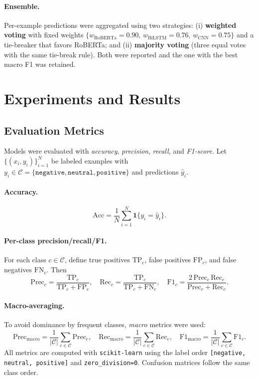 \documentclass[10pt]{article}
\begin{document}
\paragraph{Ensemble.}
Per-example predictions were aggregated using two strategies: (i) \textbf{weighted voting} with fixed weights $\{w_{\text{RoBERTa}}=0.90,\,w_{\text{BiLSTM}}=0.76,\,w_{\text{CNN}}=0.75\}$ and a tie-breaker that favors RoBERTa; and (ii) \textbf{majority voting} (three equal votes with the same tie-break rule). Both were reported and the one with the best macro F1 was retained.
\section{Experiments and Results}

\subsection{Evaluation Metrics}
Models were evaluated with \emph{accuracy}, \emph{precision}, \emph{recall}, and \emph{F1-score}. Let $\{(x_i,y_i)\}_{i=1}^N$ be labeled examples with $y_i \in \mathcal{C}=\{\texttt{negative},\texttt{neutral},\texttt{positive}\}$ and predictions $\hat{y}_i$.

\paragraph{Accuracy.}
\[
\mathrm{Acc}=\frac{1}{N}\sum_{i=1}^{N}\mathbf{1}\{y_i=\hat{y}_i\}.
\]

\paragraph{Per-class precision/recall/F1.}
For each class $c\in\mathcal{C}$, define true positives $\mathrm{TP}_c$, false positives $\mathrm{FP}_c$, and false negatives $\mathrm{FN}_c$. Then
\[
\mathrm{Prec}_c=\frac{\mathrm{TP}_c}{\mathrm{TP}_c+\mathrm{FP}_c},\quad
\mathrm{Rec}_c=\frac{\mathrm{TP}_c}{\mathrm{TP}_c+\mathrm{FN}_c},\quad
\mathrm{F1}_c= \frac{2\,\mathrm{Prec}_c\,\mathrm{Rec}_c}{\mathrm{Prec}_c+\mathrm{Rec}_c}.
\]

\paragraph{Macro-averaging.}
To avoid dominance by frequent classes, \emph{macro} metrics were used:
\[
\mathrm{Prec}_{\mathrm{macro}}=\frac{1}{|\mathcal{C}|}\sum_{c\in\mathcal{C}} \mathrm{Prec}_c,\quad
\mathrm{Rec}_{\mathrm{macro}}=\frac{1}{|\mathcal{C}|}\sum_{c\in\mathcal{C}} \mathrm{Rec}_c,\quad
\mathrm{F1}_{\mathrm{macro}}=\frac{1}{|\mathcal{C}|}\sum_{c\in\mathcal{C}} \mathrm{F1}_c.
\]
All metrics are computed with \texttt{scikit-learn} using the label order \texttt{[negative, neutral, positive]} and \texttt{zero\_division=0}. Confusion matrices follow the same class order.
\end{document}

